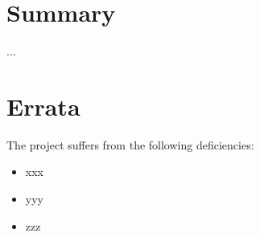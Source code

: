 \documentclass[12pt,fleqn,parskip=half,twoside,toc=index,headings=small,a4paper]{scrreprt}
\begin{document}
\chapter{Summary}
...
\chapter{Errata}
	The project suffers from the following deficiencies:
	\begin{itemize}
		\item xxx
		\item yyy
		\item zzz
	\end{itemize}
\end{document}
